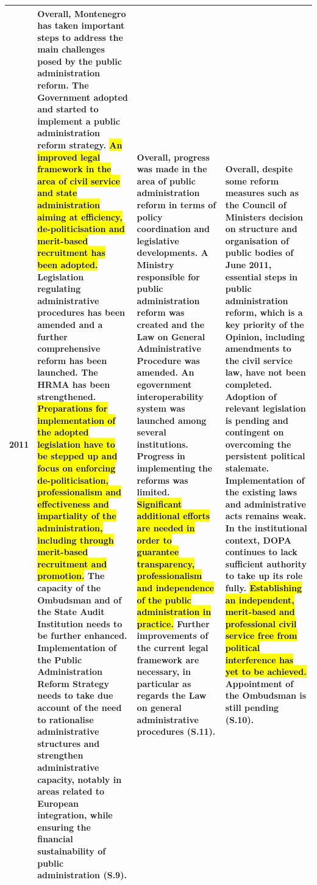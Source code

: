\begin{footnotesize}
\begin{longtable}[H]{|p{1cm}|L{49mm}|L{44mm}|L{43mm}|}
2011&
Overall, Montenegro has taken important steps to address the main challenges posed by the public administration reform. The Government adopted and started to implement a public administration reform strategy. \hl{An improved legal framework in the area of civil service and state administration aiming at efficiency, de-politicisation and merit-based recruitment has been adopted.} Legislation regulating administrative procedures has been amended and a further comprehensive reform has been launched. The HRMA has been strengthened. \hl{Preparations for implementation of the adopted legislation have to be stepped up and focus on enforcing de-politicisation, professionalism and effectiveness and impartiality of the administration, including through merit-based recruitment and promotion.} The capacity of the Ombudsman and of the State Audit Institution needs to be further enhanced. Implementation of the Public Administration Reform Strategy needs to take due account of the need to rationalise administrative structures and strengthen administrative capacity, notably in areas related to European integration, while ensuring the financial sustainability of public administration (S.9).&
Overall, progress was made in the area of public administration reform in terms of policy coordination and legislative developments. A Ministry responsible for public administration reform was created and the Law on General Administrative Procedure was amended. An egovernment interoperability system was launched among several institutions. Progress in implementing the reforms was limited. \hl{Significant additional efforts are needed in order to guarantee transparency, professionalism and independence of the public administration in practice.} Further improvements of the current legal framework are necessary, in particular as regards the Law on general administrative procedures (S.11).&
Overall, despite some reform measures such as the Council of Ministers decision on structure and organisation of public bodies of June 2011, essential steps in public administration reform, which is a key priority of the Opinion, including amendments to the civil service law, have not been completed. Adoption of relevant legislation is pending and contingent on overcoming the persistent political stalemate. Implementation of the existing laws and administrative acts remains weak. In the institutional context, DOPA continues to lack sufficient authority to take up its role fully. \hl{Establishing an independent, merit-based and professional civil service free from political interference has yet to be achieved.} Appointment of the Ombudsman is still pending (S.10).\\\hline

\end{longtable}
\end{footnotesize}
